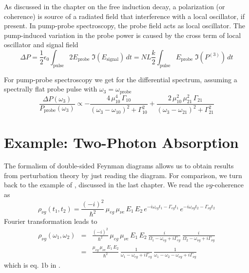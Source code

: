 As discussed in the chapter on the free induction decay, a polarization (or coherence) is source of a radiated field that interference with a local oscillator, if present. In pump-probe spectroscopy, the probe field acts as local oscillator. The pump-induced variation in the probe power is caused by the cross term of local oscillator and signal field
\begin{equation}
 \Delta P = \frac{1}{2} \epsilon_0 \int_\text{pulse}  2 E_\text{probe} \; \Im (E_\text{signal} ) \, dt 
 = N L \frac{k}{2}  \int_\text{pulse}   E_\text{probe} \; \Im ( P^{(3)} ) \, dt
\end{equation}

For pump-probe spectroscopy we get for the differential spectrum, assuming a spectrally flat probe pulse with $\omega_3 = \omega_\text{probe}$
\begin{equation}
\frac{\Delta P (\omega_3)} {P_\text{probe}(\omega_3)} 
\propto
- \frac{4 \, \mu_{10}^4 \, \Gamma_{10} } { (\omega_3 - \omega_{10})^2 + \Gamma_{10}^2} 
+ \frac{2 \, \mu_{10}^2  \, \mu_{21}^2 \, \Gamma_{21} } { (\omega_3 - \omega_{21})^2 + \Gamma_{21}^2} 
\end{equation}


\section{Example: Two-Photon Absorption}

The formalism of double-sided Feynman diagrams allows us to obtain results from perturbation theory by just reading the diagram. For comparison, we turn back to the example of \cite{Winterhalder11}, discussed in the last chapter. We read the $\nu g $-coherence as
\begin{equation}
\rho_{\nu g}(t_1, t_2) = \frac{(-i)^2}{\hbar^2} \, \mu_{eg} \, \mu_{\nu e} \, E_1 \, E_2 \,
e^{-i \omega_{eg} t_1 - \Gamma_{eg} t_1} \, 
e^{-i \omega_{\nu g} t_2 - \Gamma_{\nu g} t_2} 
\end{equation}
Fourier transformation leads to
\begin{eqnarray}
\rho_{\nu g}(\omega_1, \omega_2) &=& \frac{(-i)^2}{\hbar^2} \, \mu_{eg} \, \mu_{\nu e} \, E_1 \, E_2 \,
    \frac{i }{\Omega_1 - \omega_{eg}  + i \Gamma_{eg} } 
  \, \frac{i }{\Omega_2  -\omega_{\nu g}  + i \Gamma_{\nu g} } \\
  &=& \frac{\mu_{eg} \, \mu_{\nu e} \, E_1 \, E_2 }{\hbar^2} \,
  \frac{1 }{\omega_1 - \omega_{eg}  + i \Gamma_{eg} } 
  \, \frac{1}{\omega_1 - \omega_2  -\omega_{\nu g}  + i \Gamma_{\nu g} } 
\end{eqnarray}
which is eq. 1b in \cite{Winterhalder11}.
 

